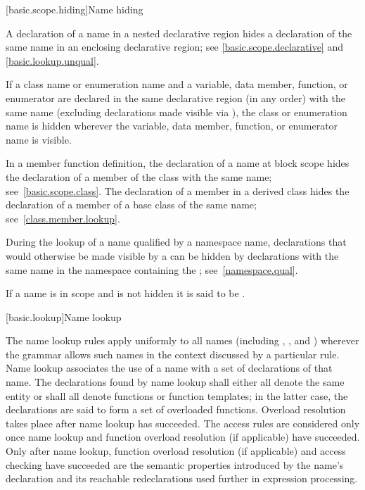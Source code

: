 [basic.scope.hiding]{Name hiding}

\pnum
{}%
%
%
A declaration of a name in a nested declarative region
hides a declaration of the same name in an enclosing declarative region;
see \ref{basic.scope.declarative} and \ref{basic.lookup.unqual}.

\pnum
{}%
If a class name or enumeration name and
a variable, data member, function, or enumerator
are declared in the same declarative region (in any order) with the
same name (excluding declarations made visible
via ),
the class or enumeration name is hidden wherever the variable, data member,
function, or enumerator name is visible.

\pnum
In a member function definition, the declaration of a name
at block scope
hides
the declaration of a member of the class with the same name;
see~\ref{basic.scope.class}. The declaration of a member in a derived
class hides the declaration of a member of
a base class of the same name; see~\ref{class.member.lookup}.

\pnum
During the lookup of a name qualified by a namespace name, declarations
that would otherwise be made visible by a  can
be hidden by declarations with the same name in the namespace containing
the ; see~\ref{namespace.qual}.

\pnum
{}%
If a name is in scope and is not hidden it is said to be .%

[basic.lookup]{Name lookup}%
%
%

\pnum
The name lookup rules apply uniformly to all names (including
,
, and
) wherever the grammar allows
such names in the context discussed by a particular rule. Name lookup
associates the use of a name with a set of declarations of
that name.
The declarations found by name lookup shall either all denote the same entity or
shall all denote functions or function templates;
in the latter case,
the declarations are said to form a set of overloaded
functions. Overload resolution
takes place after name lookup has succeeded. The access rules
are considered only once name lookup and
function overload resolution (if applicable) have succeeded. Only after
name lookup, function overload resolution (if applicable) and access
checking have succeeded
are the semantic properties introduced by the name's declaration
and its reachable redeclarations
used further in expression processing.

